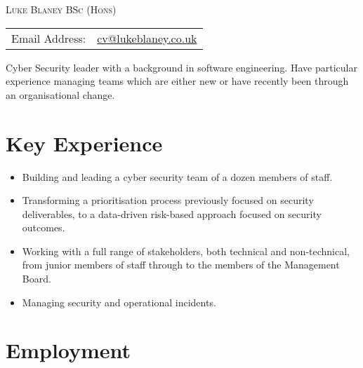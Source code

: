 \documentclass[a4paper]{article}
\newenvironment{detail}{\begin{adjustwidth}{10pt}{}}{\end{adjustwidth}}
\begin{document}
\begin{center}\textsc{\LARGE Luke Blaney BSc (Hons)}\end{center}

\begin{tabular}{ l l }

Email Address: & \href{mailto:cv@lukeblaney.co.uk}{cv@lukeblaney.co.uk}\\

\end{tabular}

\begin{detail}
Cyber Security leader with a background in software engineering.  Have particular experience managing teams which are either new or have recently been through an organisational change.
\end{detail}

\section*{Key Experience}

\begin{itemize}
	\item Building and leading a cyber security team of a dozen members of staff.
	\item Transforming a prioritisation process previously focused on security deliverables, to a data-driven risk-based approach focused on security outcomes.
	\item Working with a full range of stakeholders, both technical and non-technical, from junior members of staff through to the members of the Management Board.
	\item Managing security and operational incidents.
\end{itemize}
\section*{Employment}
\end{document}
